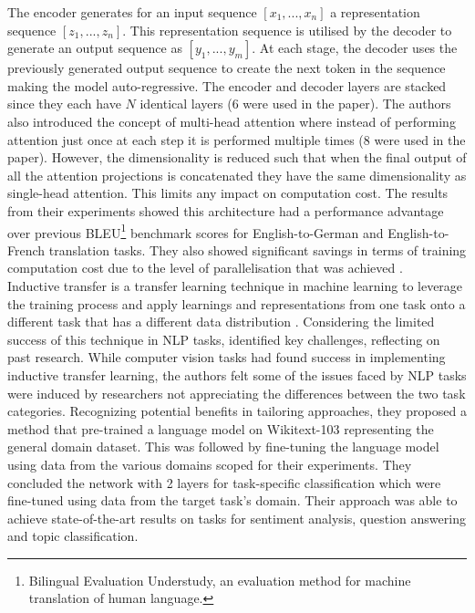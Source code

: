 The encoder generates for an input sequence $[x_1, ..., x_n]$ a representation sequence $[z_1, ..., z_n]$. This representation sequence is utilised by the decoder to generate an output sequence as $[y_1, ..., y_m]$. At each stage, the decoder uses the previously generated output sequence to create the next token in the sequence making the model auto-regressive. The encoder and decoder layers are stacked since they each have $N$ identical layers (6 were used in the paper). The authors also introduced the concept of multi-head attention where instead of performing attention just once at each step it is performed multiple times (8 were used in the paper). However, the dimensionality is reduced such that when the final output of all the attention projections is concatenated they have the same dimensionality as single-head attention. This limits any impact on computation cost. The results from their experiments showed this architecture had a performance advantage over previous BLEU\footnote{Bilingual Evaluation Understudy, an evaluation method for machine translation of human language.} benchmark scores for English-to-German and English-to-French translation tasks. They also showed significant savings in terms of training computation cost due to the level of parallelisation that was achieved \cite{vaswaniAttentionAllYou2023a}. \\

Inductive transfer is a transfer learning technique in machine learning to leverage the training process and apply learnings and representations from one task onto a different task that has a different data distribution \cite{howardUniversalLanguageModel2018}. Considering the limited success of this technique in NLP tasks, \cite{howardUniversalLanguageModel2018} identified key challenges, reflecting on past research.  While computer vision tasks had found success in implementing inductive transfer learning, the authors felt some of the issues faced by NLP tasks were induced by researchers not appreciating the differences between the two task categories. Recognizing potential benefits in tailoring approaches, they proposed a method that pre-trained a language model on Wikitext-103 \cite{merityPointerSentinelMixture2016} representing the general domain dataset. This was followed by fine-tuning the language model using data from the various domains scoped for their experiments. They concluded the network with 2 layers for task-specific classification which were fine-tuned using data from the target task's domain. Their approach was able to achieve state-of-the-art results on tasks for sentiment analysis, question answering and topic classification.\\

